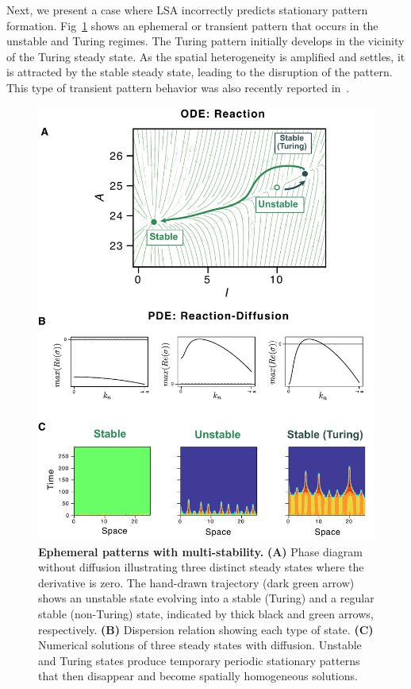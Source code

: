 \documentclass[10pt,letterpaper]{article}
\begin{document}
Next, we present a case where LSA incorrectly predicts stationary pattern formation.
Fig~\ref{fig:multistability2} shows an ephemeral or transient pattern that occurs in the unstable and Turing regimes.
The Turing pattern initially develops in the vicinity of the Turing steady state.
As the spatial heterogeneity is amplified and settles, it is attracted by the stable steady state, leading to the disruption of the pattern.
This type of transient pattern behavior was also recently reported in~\cite{Krause2023}.

\begin{figure}[bp!]
        \includegraphics[width=1\textwidth]{figures/multistability2} %
    \caption{\textbf{Ephemeral patterns with multi-stability.} \textbf{(A)} Phase diagram without diffusion illustrating three distinct steady states where the derivative is zero. The hand-drawn trajectory (dark green arrow) shows an unstable state evolving into a stable (Turing) and a regular stable (non-Turing) state, indicated by thick black and green arrows, respectively. \textbf{(B)} Dispersion relation showing each type of state. \textbf{(C)} Numerical solutions of three steady states with diffusion. Unstable and Turing states produce temporary periodic stationary patterns that then disappear and become spatially homogeneous solutions.}
    \label{fig:multistability2} %
\end{figure}
\end{document}
